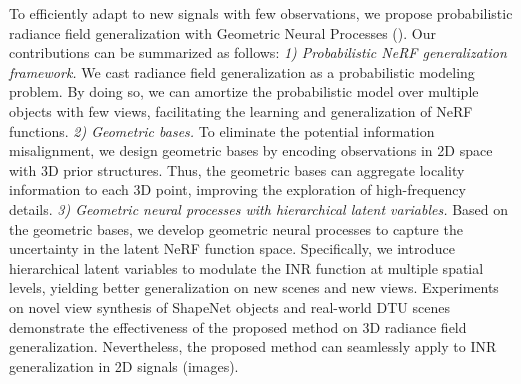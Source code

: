 To efficiently adapt to new signals with few observations, 
we propose probabilistic radiance field generalization with Geometric Neural Processes (\name{}). 
Our contributions can be summarized as follows: 
\textit{1) Probabilistic NeRF generalization framework.}  We cast radiance field generalization as a probabilistic modeling problem. By doing so, we can amortize the probabilistic model over multiple objects with few views, facilitating the learning and generalization of NeRF functions.
\textit{2) Geometric bases.} To eliminate the 
potential information misalignment, we design geometric bases by encoding observations in 2D space with 3D prior structures. Thus, the geometric bases can aggregate locality information to each 3D point, improving the exploration of high-frequency details.
\textit{3) Geometric neural processes with hierarchical latent variables.}
Based on the geometric bases, we develop geometric neural processes to capture the uncertainty in the latent NeRF function space.
Specifically, we introduce hierarchical latent variables to modulate the INR function at multiple spatial levels, yielding better generalization on new scenes and new views.
Experiments on novel view synthesis of ShapeNet objects and real-world DTU scenes demonstrate the effectiveness of the proposed method on 3D radiance field generalization. Nevertheless, the proposed method can seamlessly apply to INR generalization in 2D signals (images). %

